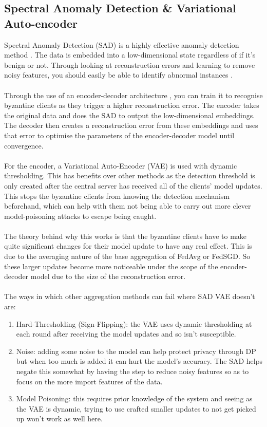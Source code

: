 \subsection{Spectral Anomaly Detection \& Variational Auto-encoder}
Spectral Anomaly Detection (SAD) is a highly effective anomaly detection method \cite{sad}.
The data is embedded into a low-dimensional state regardless of if it's benign or not.
Through looking at reconstruction errors and learning to remove noisy features, you should easily be able to identify abnormal instances \cite{variationalAB}.
\\ \\
Through the use of an encoder-decoder architecture \cite{spectral}, you can train it to recognise byzantine clients as they trigger a higher reconstruction error.
The encoder takes the original data and does the SAD to output the low-dimensional embeddings.
The decoder then creates a reconstruction error from these embeddings and uses that error to optimise the parameters of the encoder-decoder model until convergence.
\\ \\
For the encoder, a Variational Auto-Encoder (VAE) is used with dynamic thresholding.
This has benefits over other methods as the detection threshold is only created after the central server has received all of the clients' model updates.
This stops the byzantine clients from knowing the detection mechanism beforehand, which can help with them not being able to carry out more clever model-poisoning attacks to escape being caught.
\\ \\
The theory behind why this works is that the byzantine clients have to make quite significant changes for their model update to have any real effect.
This is due to the averaging nature of the base aggregation of FedAvg or FedSGD.
So these larger updates become more noticeable under the scope of the encoder-decoder model due to the size of the reconstruction error.
\\ \\
The ways in which other aggregation methods can fail where SAD VAE doesn't are:
\begin{enumerate}
    \item Hard-Thresholding (Sign-Flipping): the VAE uses dynamic thresholding at each round after receiving the model updates and so isn't susceptible.
    
    \item Noise: adding some noise to the model can help protect privacy through DP but when too much is added it can hurt the model's accuracy. 
    The SAD helps negate this somewhat by having the step to reduce noisy features so as to focus on the more import features of the data.
    
    \item Model Poisoning: this requires prior knowledge of the system and seeing as the VAE is dynamic, trying to use crafted smaller updates to not get picked up won't work as well here.
\end{enumerate}

